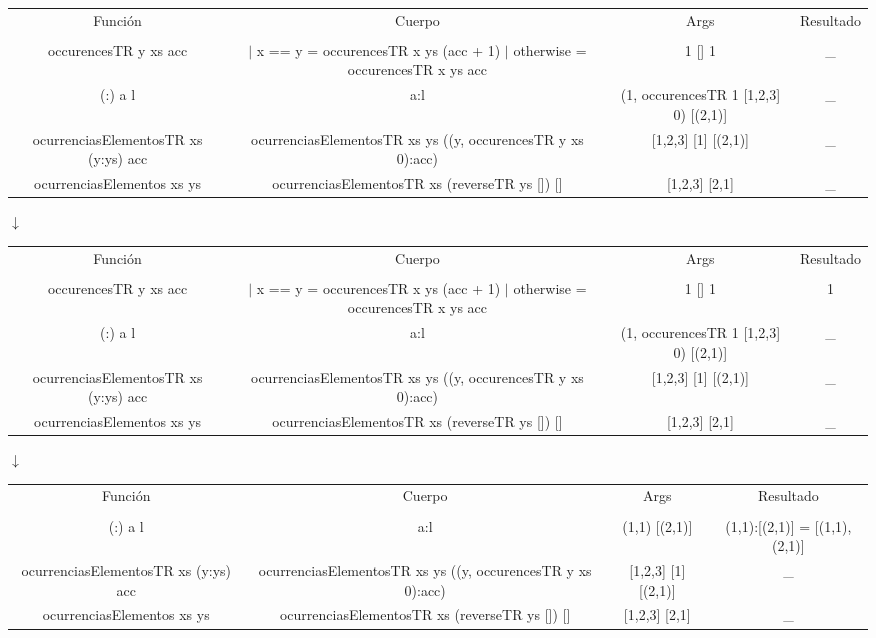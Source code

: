\begin{enumerate}
{\begin{itemize}
{\begin{center}
                \begin{NiceTabular}{|c c c c|}
                    Función & Cuerpo & Args & Resultado \\
                    &&&\\
                    occurencesTR y xs acc & $|$ x == y = occurencesTR x ys (acc + 1) $|$ otherwise = occurencesTR x ys acc & 1 [] 1 & \_ \\ \hline
                    (:) a l & a:l & (1, occurencesTR 1 [1,2,3] 0) [(2,1)] & \_ \\ \hline
                    ocurrenciasElementosTR xs (y:ys) acc & ocurrenciasElementosTR xs ys ((y, occurencesTR y xs 0):acc) & [1,2,3] [1] [(2,1)] & \_ \\ \hline
                    ocurrenciasElementos xs ys & ocurrenciasElementosTR xs (reverseTR ys []) [] & [1,2,3] [2,1] & \_ \\ \hline
                \end{NiceTabular}

                $\downarrow$
                
                \begin{NiceTabular}{|c c c c|}
                    Función & Cuerpo & Args & Resultado \\
                    &&&\\
                    occurencesTR y xs acc & $|$ x == y = occurencesTR x ys (acc + 1) $|$ otherwise = occurencesTR x ys acc & 1 [] 1 & 1 \\ \hline
                    (:) a l & a:l & (1, occurencesTR 1 [1,2,3] 0) [(2,1)] & \_ \\ \hline
                    ocurrenciasElementosTR xs (y:ys) acc & ocurrenciasElementosTR xs ys ((y, occurencesTR y xs 0):acc) & [1,2,3] [1] [(2,1)] & \_ \\ \hline
                    ocurrenciasElementos xs ys & ocurrenciasElementosTR xs (reverseTR ys []) [] & [1,2,3] [2,1] & \_ \\ \hline
                \end{NiceTabular}

                $\downarrow$
                
                \begin{NiceTabular}{|c c c c|}
                    Función & Cuerpo & Args & Resultado \\
                    &&&\\
                    (:) a l & a:l & (1,1) [(2,1)] & (1,1):[(2,1)] = [(1,1),(2,1)] \\ \hline
                    ocurrenciasElementosTR xs (y:ys) acc & ocurrenciasElementosTR xs ys ((y, occurencesTR y xs 0):acc) & [1,2,3] [1] [(2,1)] & \_ \\ \hline
                    ocurrenciasElementos xs ys & ocurrenciasElementosTR xs (reverseTR ys []) [] & [1,2,3] [2,1] & \_ \\ \hline
                \end{NiceTabular}


\end{center}}
\end{itemize}}
\end{enumerate}
